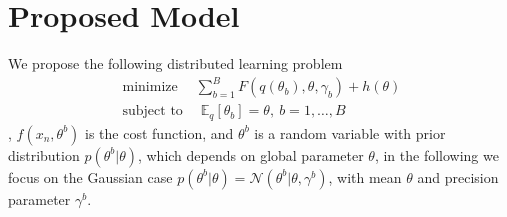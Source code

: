 \documentclass{article}
\DeclareMathOperator*{\minimize}{minimize}
\DeclareMathOperator*{\st}{subject~to}
\newcommand{\1}[0]{\ensuremath{\boldsymbol{1}}\xspace}
\begin{document}
\section{Proposed Model}
We propose the following distributed learning problem
\begin{equation}\label{basic_model}
\begin{gathered}
\minimize \quad\sum_{b=1}^B F(q(\theta_b), \theta, \gamma_b) + h(\theta)\\
\st \quad \mathbb{E}_q[\theta_b] = \theta, ~ b = 1, \ldots, B
\end{gathered}
\end{equation}
,  $f(x_n, \theta^b)$ is the cost function, and $\theta^b$ is a random variable with prior distribution $p(\theta^b|\theta)$, which depends on global parameter $\theta$, in the following we focus on the Gaussian case $p(\theta^b|\theta) = \mathcal{N}(\theta^b | \theta, \gamma^b)$, with mean $\theta$ and precision parameter $\gamma^b$.
\end{document}
